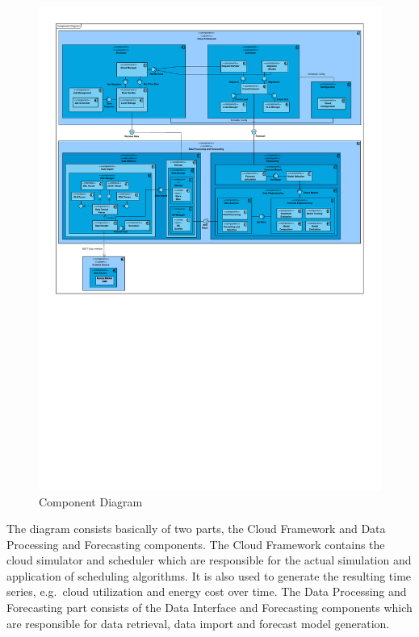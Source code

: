 \begin{figure}[htbp]
	\hspace*{-0.4in}
		\includegraphics[angle=90,width=\paperheight,height=\paperwidth,keepaspectratio=true]{figures/results/Component_Diagram.pdf}
	\caption{Component Diagram}
	\label{fig:Component_Diagram}
\end{figure}

The diagram consists basically of two parts, the Cloud Framework and Data Processing and Forecasting components. The Cloud Framework contains the cloud simulator and scheduler which are responsible for the actual simulation and application of scheduling algorithms. It is also used to generate the resulting time series, e.g.~cloud utilization and energy cost over time. The Data Processing and Forecasting part consists of the Data Interface and Forecasting components which are responsible for data retrieval, data import and forecast model generation. 

